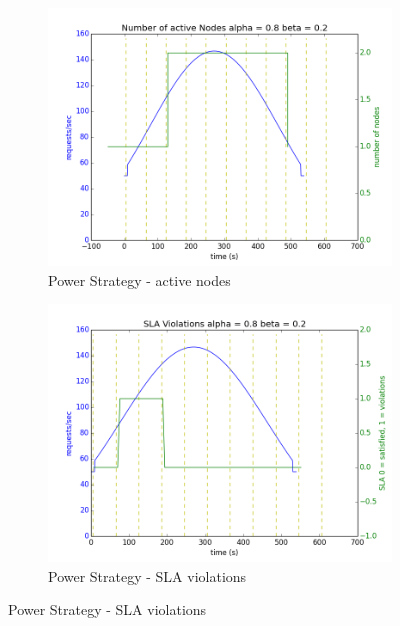 \documentclass[12pt]{article}
\begin{document}
\begin{figure}[h!]
\begin{subfigure}{.5\textwidth}
\includegraphics[width=\textwidth]{Power182nodes.png}
\caption{Power Strategy - active nodes}
\end{subfigure}
\begin{subfigure}{.5\textwidth}
\includegraphics[width=\textwidth]{Power182SLA.png}
\caption{Power Strategy - SLA violations}
\end{subfigure}


\end{figure}
\end{document}
